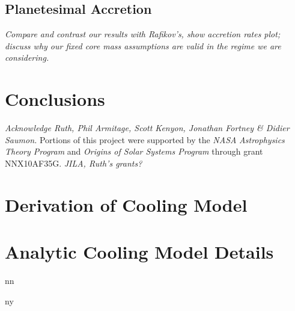 \documentclass[apj]{emulateapj}
\newcommand\submitms{n}		%
\newcommand\bibinc{n}		%
\newcommand{\emgr}[1]{\emph{ \color{gray} #1}}
\begin{document}
\subsection{Planetesimal Accretion}
\emgr{Compare and contrast our results with Rafikov's, show accretion rates plot; discuss why our fixed core mass assumptions are valid in the regime we are considering.}


\section{Conclusions}





\acknowledgements
\emgr{Acknowledge Ruth, Phil Armitage, Scott Kenyon, Jonathan Fortney \& Didier Saumon.}  Portions of this project were supported by the {\it NASA} {\it Astrophysics Theory Program} and  {\it Origins of Solar Systems Program}  through grant NNX10AF35G. \emgr{JILA, Ruth's grants?}\\

\appendix
\section{Derivation of Cooling Model}\label{sec:virial}
\section{Analytic Cooling Model Details}\label{sec:analytic}

\if\bibinc n

\fi

\if\bibinc y
\begin{thebibliography}
\end{thebibliography}
\fi
\end{document}
